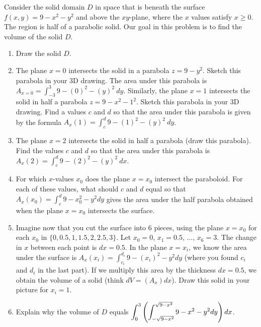 \begin{problem}
Consider the solid domain $D$ in space that is beneath the surface $f(x,y)=9-x^2-y^2$ and above the $xy$-plane, where the $x$ values satisfy $x\geq 0$.  The region is half of a parabolic solid.  Our goal in this problem is to find the volume of the solid $D$.
\begin{enumerate}
 \item Draw the solid $D$. 
 \item The plane $x=0$ intersects the solid in a parabola $z=9-y^2$. Sketch this parabola in your 3D drawing. The area under this parabola is $A_{x=0} = \int_{-3}^3 9-(0)^2-(y)^2 \ dy$. 
 Similarly, the plane $x=1$ intersects the solid in half a parabola $z=9-x^2-1^2$. Sketch this parabola in your 3D drawing. Find a values $c$ and $d$ so that the area under this parabola is given by the formula $A_x(1)=\int_c^{d} 9-(1)^2-(y)^2 \ dy$.
 \item The plane $x=2$ intersects the solid in half a parabola (draw this parabola). Find the values $c$ and $d$ so that the area under this parabola is $A_x(2)=\int_c^d 9-(2)^2-(y)^2 \ dx$.
 \item {}
For which $x$-values $x_0$ does the plane $x=x_0$ intersect the paraboloid. For each of these values, what should $c$ and $d$ equal so that $A_x(x_0) = \int_c^d 9-x_0^2-y^2 dy$ gives the area under the half parabola obtained when the plane $x=x_0$ intersects the surface. 
 \item Imagine now that you cut the surface into 6 pieces, using the plane $x=x_0$ for each $x_0$ in $\{0,0.5,1,1.5,2, 2.5,3\}$. Let $x_0=0$, $x_1=0.5$, $\ldots$, $x_{6}=3$. The change in $x$ between each point is $dx=0.5$. 
 In the plane $x=x_i$, we know the area under the surface is $A_x(x_i) = \int_{c_i}^{d_i} 9-(x_i)^2-y^2 dy$ (where you found $c_i$  and $d_i$ in the last part).  If we multiply this area by the thickness $dx=0.5$, we obtain the volume of a solid (think $dV=(A_x)dx$).  Draw this solid in your picture for $x_i = 1$. 
\item Explain why the volume of $D$ equals $\displaystyle\int_{0}^{3} \left(\int_{-\sqrt{9-x^2}}^{\sqrt{9-x^2}}9-x^2-y^2 dy\right) dx$.
\end{enumerate}
\end{problem}

